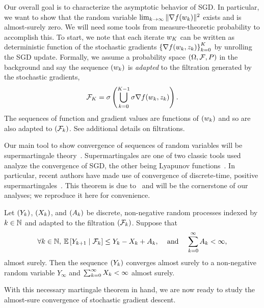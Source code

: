 Our overall goal is to characterize the asymptotic behavior of SGD.
In particular, we want to show that the random variable \( \lim_{k \rightarrow \infty} \|\nabla f(w_k)\|^2 \) exists and is almost-surely zero.
We will need some tools from measure-theoretic probability to accomplish this.
To start, we note that each iterate \( w_K \) can be written as deterministic function of the stochastic gradients \( \left\{\nabla f(w_k, z_{k})\right\}_{k=0}^{K} \) by unrolling the SGD update.
Formally, we assume a probability space \( \left(\Omega,  \mathcal{F}, P\right) \) in the background and say the sequence \( \left(w_k\right) \) is \emph{adapted} to the filtration generated by the stochastic gradients,
\begin{align*}
    \mathcal{F}_K = \sigma \left(\bigcup_{k = 0}^{K-1} \sigma \nabla f(w_k, z_{k})\right).
\end{align*}
The sequences of function and gradient values are functions of \( \left(w_k\right) \) and so are also adapted to \( \left(\mathcal{F}_k\right) \).
See \citet{ccinlar2011probability} additional details on filtrations.

Our main tool to show convergence of sequences of random variables will be supermartingale theory~\citep{}.
Supermartingales are one of two classic tools used analyze the convergence of SGD, the other being Lyapunov functions~\citep{bertsekas2000gradient}.
In particular, recent authors have made use of convergence of discrete-time, positive supermartingales~\citep{bertsekas2011incremental, nguyen2018sgd}.
This theorem is due to~\citet{neveu1975discrete} and will be the cornerstone of our analyses; we reproduce it here for convenience.

\begin{theorem}\label{thm:positive_supermartingales}
    Let \( \left(Y_k\right) \), \( \left(X_k\right) \), and \( \left(A_k\right) \) be discrete, non-negative random processes indexed by \( k \in \mathbb{N} \) and adapted to the filtration \( \left(\mathcal{F}_k\right) \).
    Suppose that
    \begin{align*}
        \forall k \in \mathbb{N}, \: \mathbb{E} \left[Y_{k+1} \mid \mathcal{F}_k\right] \leq Y_k - X_k + A_k,
        && \text{ and } &&
        \sum_{k=0}^{\infty} A_k < \infty,
    \end{align*}
    almost surely.
    Then the sequence \( \left(Y_k\right) \) converges almost surely to a non-negative random variable \( Y_\infty \) and \( \sum_{k=0}^{\infty} X_k < \infty \) almost surely.
\end{theorem}
With this necessary martingale theorem in hand, we are now ready to study the almost-sure convergence of stochastic gradient descent.

